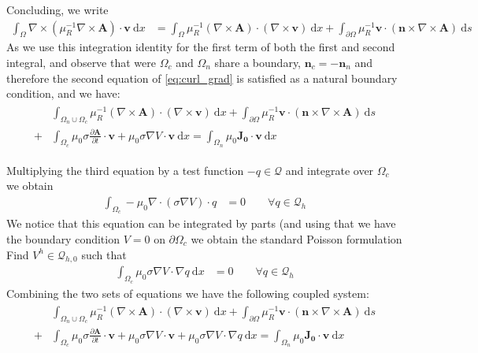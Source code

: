 \documentclass{article}
\newcommand{\curlp}[1]{\nabla \times \left(#1\right)}
\newcommand{\curl}[1]{\nabla \times #1}
\newcommand{\divmp}[1]{\nabla \cdot \left(#1\right)}
\newcommand{\mbf}[1]{\mathbf{#1}}
\newcommand{\ddn}[2]{\frac{\partial #1}{\partial #2}}
\newcommand{\dx}[0]{~\mathrm{d}x}
\newcommand{\ds}[0]{~\mathrm{d}s}
\newcommand{\pOmega}[0]{\partial\Omega}
\begin{document}
Concluding, we write
\begin{align}
    \int_{\Omega} \curlp{\mu_R^{-1} \nabla \times \mbf{A}} \cdot \mbf{v}\dx&=
    \int_{\Omega}\mu_R^{-1}(\curl\mbf{A})\cdot (\curl \mbf{v}) \dx
    + \int_{\pOmega}\mu_R^{-1}\mbf{v}\cdot(\mbf{n}\times \curl\mbf{A})\ds
\end{align}
As we use this integration identity for the first term of both the first
and second integral, and observe that were $\Omega_c$ and $\Omega_n$
share a boundary, $\mbf{n}_c=-\mbf{n}_n$ and therefore the second
equation of \cref{eq:curl_grad} is satisfied as a natural boundary
condition, and we have:
\begin{align}
\begin{split}
    &\int_{\Omega_n\cup\Omega_c} \mu_R^{-1}(\curl\mbf{A})\cdot (\curl \mbf{v}) \dx
    + \int_{\pOmega}\mu_R^{-1}\mbf{v}\cdot(\mbf{n}\times \curl\mbf{A})\ds\\
    +& \int_{\Omega_c}\mu_0\sigma \ddn{\mbf{A}}{t}\cdot \mbf{v} + \mu_0\sigma \nabla V \cdot \mbf{v}\dx
    =\int_{\Omega_n}\mu_0\mbf{J_0} \cdot \mbf{v} \dx
\end{split}
\end{align}

Multiplying the third equation by a test function $-q\in \mathcal{Q}$
and integrate over $\Omega_c$ we obtain
\begin{align*}
    \int_{\Omega_c}-\mu_0\divmp{\sigma \nabla V} \cdot q &= 0 \qquad \forall q\in \mathcal{Q}_h
\end{align*}
We notice that this equation can be integrated by parts (and using that
we have the boundary condition $V=0$ on $\pOmega_c$ we obtain the
standard Poisson formulation Find $V^h\in\mathcal{Q}_{h,0}$ such that
\begin{align*}
    \int_{\Omega_c}\mu_0\sigma \nabla V \cdot \nabla q \dx &=0 \qquad \forall q\in \mathcal{Q}_h
\end{align*}
Combining the two sets of equations we have the following coupled system:
\begin{align}
\begin{split}
    &\int_{\Omega_n\cup\Omega_c} \mu_R^{-1}(\curl\mbf{A})\cdot (\curl \mbf{v}) \dx
    + \int_{\pOmega}\mu_R^{-1}\mbf{v}\cdot(\mbf{n}\times \curl\mbf{A})\ds\\
    +& \int_{\Omega_c}\mu_0\sigma \ddn{\mbf{A}}{t}\cdot \mbf{v} + \mu_0\sigma \nabla V \cdot \mbf{v}
    +\mu_0\sigma \nabla V \cdot \nabla q \dx
    =\int_{\Omega_n}\mu_0\mbf{J_0} \cdot \mbf{v} \dx
\end{split}
\end{align}
\end{document}
